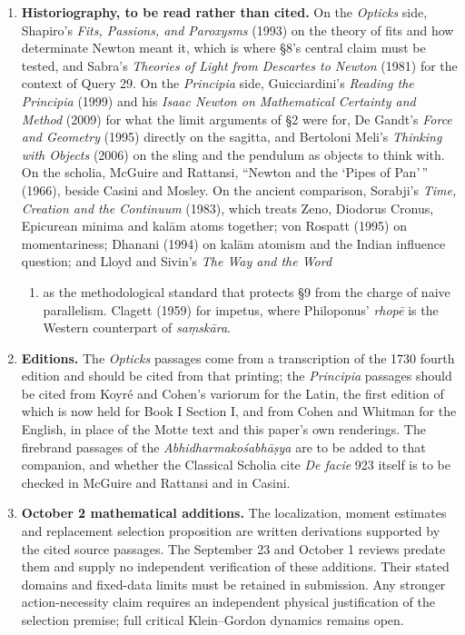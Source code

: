 \documentclass[11pt,a4paper]{article}
\newcommand{\tightlist}{\setlength{\itemsep}{0pt}\setlength{\parskip}{0pt}}
\begin{document}
\begin{enumerate}
\def\labelenumi{\arabic{enumi}.}
\tightlist
\item
  \textbf{Historiography, to be read rather than cited.} On the
  \emph{Opticks} side, Shapiro's \emph{Fits, Passions, and Paroxysms}
  (1993) on the theory of fits and how determinate Newton meant it,
  which is where §8's central claim must be tested, and Sabra's
  \emph{Theories of Light from Descartes to Newton} (1981) for the
  context of Query 29. On the \emph{Principia} side, Guicciardini's
  \emph{Reading the Principia} (1999) and his \emph{Isaac Newton on
  Mathematical Certainty and Method} (2009) for what the limit arguments
  of §2 were for, De Gandt's \emph{Force and Geometry} (1995) directly
  on the sagitta, and Bertoloni Meli's \emph{Thinking with Objects}
  (2006) on the sling and the pendulum as objects to think with. On the
  scholia, McGuire and Rattansi, ``Newton and the `Pipes of Pan'\,''
  (1966), beside Casini and Mosley. On the ancient comparison, Sorabji's
  \emph{Time, Creation and the Continuum} (1983), which treats Zeno,
  Diodorus Cronus, Epicurean minima and kalām atoms together; von
  Rospatt (1995) on momentariness; Dhanani (1994) on kalām atomism and
  the Indian influence question; and Lloyd and Sivin's \emph{The Way and
  the Word}

  \begin{enumerate}
  \def\labelenumii{(\arabic{enumii})}
  \setcounter{enumii}{2001}
  \tightlist
  \item
    as the methodological standard that protects §9 from the charge of
    naive parallelism. Clagett (1959) for impetus, where Philoponus'
    \emph{rhopē} is the Western counterpart of \emph{saṃskāra}.
  \end{enumerate}
\item
  \textbf{Editions.} The \emph{Opticks} passages come from a
  transcription of the 1730 fourth edition and should be cited from that
  printing; the \emph{Principia} passages should be cited from Koyré and
  Cohen's variorum for the Latin, the first edition of which is now held
  for Book I Section I, and from Cohen and Whitman for the English, in
  place of the Motte text and this paper's own renderings. The firebrand
  passages of the \emph{Abhidharmakośabhāṣya} are to be added to that
  companion, and whether the Classical Scholia cite \emph{De facie} 923
  itself is to be checked in McGuire and Rattansi and in Casini.
\item
  \textbf{October 2 mathematical additions.} The localization, moment
  estimates and replacement selection proposition are written
  derivations supported by the cited source passages. The September 23
  and October 1 reviews predate them and supply no independent
  verification of these additions. Their stated domains and fixed-data
  limits must be retained in submission. Any stronger action-necessity
  claim requires an independent physical justification of the selection
  premise; full critical Klein--Gordon dynamics remains open.
\end{enumerate}
\end{document}
